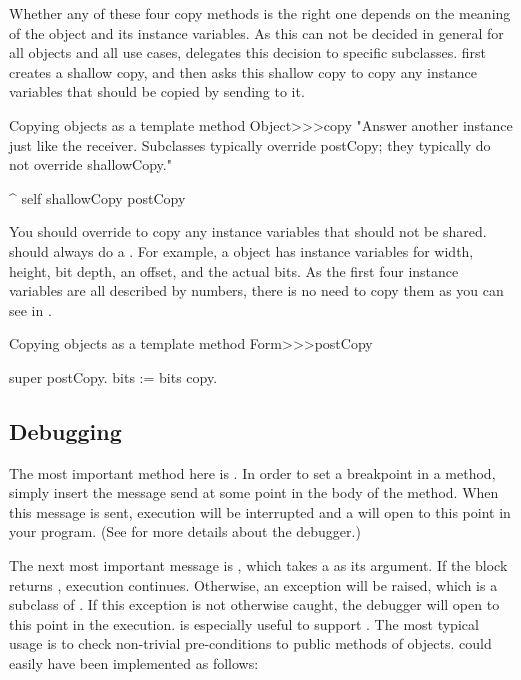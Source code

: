 \documentclass[a4paper,10pt,twoside]{book}
\begin{document}
Whether any of these four copy methods is the right one depends on the meaning of the object and its instance variables. 
As this can not be decided in general for all objects and all use cases,  delegates this decision to specific subclasses. 
 first creates a shallow copy, and then asks this shallow copy to copy any instance variables that should be copied by sending  to it.

\begin{method}{Copying objects as a template method}
Object>>>copy
    "Answer another instance just like the receiver. Subclasses typically override postCopy; they typically do not override shallowCopy."

    ^ self shallowCopy postCopy
\end{method}

You should override  to copy any instance variables that should not be shared.
 should always do a . 
For example, a  object has instance variables for width, height, bit depth, an offset, and the actual bits. 
As the first four instance variables are all described by numbers, there is no need to copy them as you can see in .

\begin{method}{Copying objects as a template method}
Form>>>postCopy

	super postCopy.
    bits := bits copy.
\end{method}



\subsection{Debugging}

The most important method here is .
In order to set a breakpoint in a method, simply insert the message send  at some point in the body of the method.
When this message is sent, execution will be interrupted and a  will open to this point in your program.
(See  for more details about the debugger.)


The next most important message is , which takes a  as its argument.
If the block returns , execution continues.
Otherwise, an  exception will be raised, which is a subclass of .
If this exception is not otherwise caught, the debugger will open to this point in the execution.
 is especially useful to support .
The most typical usage is to check non-trivial pre-conditions to public methods of objects.
 could easily have been implemented as follows:
\end{document}

